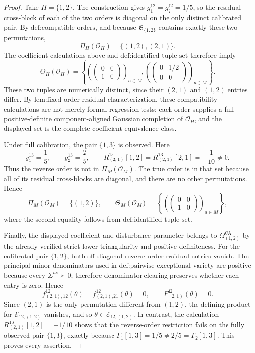 \documentclass{article}
\begin{document}
\begin{proof}
Take \(H=\{1,2\}\).  The construction gives
\(g_1^{12}=g_2^{12}=1/5\), so the residual cross-block of each of the two orders is diagonal on the only distinct calibrated pair.  By \(\text{def:compatible-orders}\), and because \(\mathfrak S_{\{1,2\}}\) contains exactly these two permutations,
\[
\Pi_H(\mathcal O_H)=\{(1,2),(2,1)\}.
\]
The coefficient calculations above and \(\text{def:identified-tuple-set}\) therefore imply
\[
\Theta_H(\mathcal O_H)
=\left\{
\left(\begin{pmatrix}0&0\\1&0\end{pmatrix}\right)_{a\in M},
\left(\begin{pmatrix}0&1/2\\0&0\end{pmatrix}\right)_{a\in M}
\right\}.
\]
These two tuples are numerically distinct, since their \((2,1)\) and \((1,2)\) entries differ.  By \(\text{lem:fixed-order-residual-characterization}\), these compatibility calculations are not merely formal regression tests: each order supplies a full positive-definite component-aligned Gaussian completion of \(\mathcal O_H\), and the displayed set is the complete coefficient equivalence class.

Under full calibration, the pair \(\{1,3\}\) is observed.  Here
\[
g_1^{13}=\frac15,
\qquad
g_2^{13}=\frac25,
\qquad
R_{(2,1)}^{13}[1,2]
=R_{(2,1)}^{13}[2,1]
=-\frac1{10}\ne0.
\]
Thus the reverse order is not in \(\Pi_M(\mathcal O_M)\).  The true order is in that set because all of its residual cross-blocks are diagonal, and there are no other permutations.  Hence
\[
\Pi_M(\mathcal O_M)=\{(1,2)\},
\qquad
\Theta_M(\mathcal O_M)
=\left\{\left(\begin{pmatrix}0&0\\1&0\end{pmatrix}\right)_{a\in M}\right\},
\]
where the second equality follows from \(\text{def:identified-tuple-set}\).

Finally, the displayed coefficient and disturbance parameter belongs to
\(\Omega_{(1,2)}^{\mathrm{CA}}\) by the already verified strict lower-triangularity and positive definiteness.  For the calibrated pair \(\{1,2\}\), both off-diagonal reverse-order residual entries vanish.  The principal-minor denominators used in \(\text{def:pairwise-exceptional-variety}\) are positive because every \(\Sigma^{aa}\succ0\); therefore denominator clearing preserves whether each entry is zero.  Hence
\[
f_{(2,1),12}^{12}(\theta)=f_{(2,1),21}^{12}(\theta)=0,
\qquad
F_{(2,1)}^{12}(\theta)=0.
\]
Since \((2,1)\) is the only permutation different from \((1,2)\), the defining product for \(\mathcal E_{12,(1,2)}\) vanishes, and so \(\theta\in\mathcal E_{12,(1,2)}\).  In contrast, the calculation \(R_{(2,1)}^{13}[1,2]=-1/10\) shows that the reverse-order restriction fails on the fully observed pair \(\{1,3\}\), exactly because \(\Gamma_1[1,3]=1/5\ne2/5=\Gamma_2[1,3]\).  This proves every assertion.
\end{proof}
\end{document}
